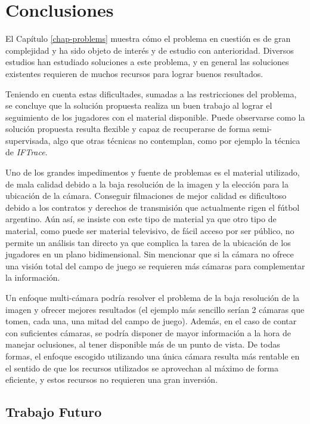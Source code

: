 \chapter{Conclusiones}
\label{chap-conclusion}

El Capítulo \ref{chap-problems} muestra cómo el problema en cuestión es de gran
complejidad y ha sido objeto de interés y de estudio con anterioridad. Diversos
estudios han estudiado soluciones a este problema, y en general las soluciones
existentes requieren de muchos recursos para lograr buenos resultados.

Teniendo en cuenta estas dificultades, sumadas a las restricciones del
problema, se concluye que la solución propuesta realiza un buen trabajo al
lograr el seguimiento de los jugadores con el material disponible. Puede
observarse como la solución propuesta resulta flexible y capaz de recuperarse
de forma semi-supervisada, algo que otras técnicas no contemplan, como por
ejemplo la técnica de \textit{IFTrace}.

Uno de los grandes impedimentos y fuente de problemas es el material utilizado,
de mala calidad debido a la baja resolución de la imagen y la elección para la
ubicación de la cámara. Conseguir filmaciones de mejor calidad es dificultoso
debido a los contratos y derechos de transmisión que actualmente rigen el fútbol
argentino. %
Aún así, se insiste con este tipo de material ya que otro tipo de
material, como puede ser material televisivo, de fácil acceso por ser público,
no permite un análisis tan directo ya que complica la tarea de la ubicación de
los jugadores en un plano bidimensional. Sin mencionar que si la cámara no
ofrece una visión total del campo de juego se requieren más cámaras para
complementar la información.

Un enfoque multi-cámara podría resolver el problema de la baja resolución de la
imagen y ofrecer mejores resultados (el ejemplo más sencillo serían 2 cámaras
que tomen, cada una, una mitad del campo de juego). Además, en el caso
de contar con suficientes cámaras, se podría disponer de mayor información a la
hora de manejar oclusiones, al tener disponible más de un punto de vista.
 De todas %
formas, el enfoque escogido utilizando una única cámara resulta más rentable en
el sentido de que los recursos utilizados se aprovechan al máximo de forma
eficiente, y estos recursos no requieren una gran inversión.

\section{Trabajo Futuro}

